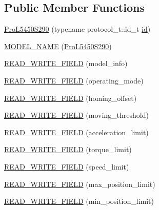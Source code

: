 \subsection*{Public Member Functions}
\begin{DoxyCompactItemize}
\item 
\hyperlink{classdynamixel_1_1servos_1_1_pro_l5450_s290_ab48d4699e02dd7b9feb06737213f9adc}{Pro\+L5450\+S290} (typename protocol\+\_\+t\+::id\+\_\+t \hyperlink{classdynamixel_1_1servos_1_1_servo_a2d022081672e25a7bb57b76706e1cc57}{id})
\item 
\hyperlink{classdynamixel_1_1servos_1_1_pro_l5450_s290_a4c93092276d36fc242b502ccee3e3770}{M\+O\+D\+E\+L\+\_\+\+N\+A\+ME} (\hyperlink{classdynamixel_1_1servos_1_1_pro_l5450_s290}{Pro\+L5450\+S290})
\item 
\hyperlink{classdynamixel_1_1servos_1_1_pro_l5450_s290_afdfc2eea9418f8a34d5ce47217f8b0ae}{R\+E\+A\+D\+\_\+\+W\+R\+I\+T\+E\+\_\+\+F\+I\+E\+LD} (model\+\_\+info)
\item 
\hyperlink{classdynamixel_1_1servos_1_1_pro_l5450_s290_adb5c4cf685b9289863faa8d8bdabc90a}{R\+E\+A\+D\+\_\+\+W\+R\+I\+T\+E\+\_\+\+F\+I\+E\+LD} (operating\+\_\+mode)
\item 
\hyperlink{classdynamixel_1_1servos_1_1_pro_l5450_s290_a6a862369792c16ab70d47e438886cfe3}{R\+E\+A\+D\+\_\+\+W\+R\+I\+T\+E\+\_\+\+F\+I\+E\+LD} (homing\+\_\+offset)
\item 
\hyperlink{classdynamixel_1_1servos_1_1_pro_l5450_s290_aecc4b318e6646393d58c4607bda6903b}{R\+E\+A\+D\+\_\+\+W\+R\+I\+T\+E\+\_\+\+F\+I\+E\+LD} (moving\+\_\+threshold)
\item 
\hyperlink{classdynamixel_1_1servos_1_1_pro_l5450_s290_ae20daaf6e3673a3a3fc9c9c2cbf15cbc}{R\+E\+A\+D\+\_\+\+W\+R\+I\+T\+E\+\_\+\+F\+I\+E\+LD} (acceleration\+\_\+limit)
\item 
\hyperlink{classdynamixel_1_1servos_1_1_pro_l5450_s290_a4ffb669959117517221e76b491d6808b}{R\+E\+A\+D\+\_\+\+W\+R\+I\+T\+E\+\_\+\+F\+I\+E\+LD} (torque\+\_\+limit)
\item 
\hyperlink{classdynamixel_1_1servos_1_1_pro_l5450_s290_a83635258cae7faa9c0f7d5888611abc7}{R\+E\+A\+D\+\_\+\+W\+R\+I\+T\+E\+\_\+\+F\+I\+E\+LD} (speed\+\_\+limit)
\item 
\hyperlink{classdynamixel_1_1servos_1_1_pro_l5450_s290_a247dad551d8c796cc2680f02d271530b}{R\+E\+A\+D\+\_\+\+W\+R\+I\+T\+E\+\_\+\+F\+I\+E\+LD} (max\+\_\+position\+\_\+limit)
\item 
\hyperlink{classdynamixel_1_1servos_1_1_pro_l5450_s290_a6b19193767067ba8d234aed951e70efb}{R\+E\+A\+D\+\_\+\+W\+R\+I\+T\+E\+\_\+\+F\+I\+E\+LD} (min\+\_\+position\+\_\+limit)

\end{DoxyCompactItemize}
